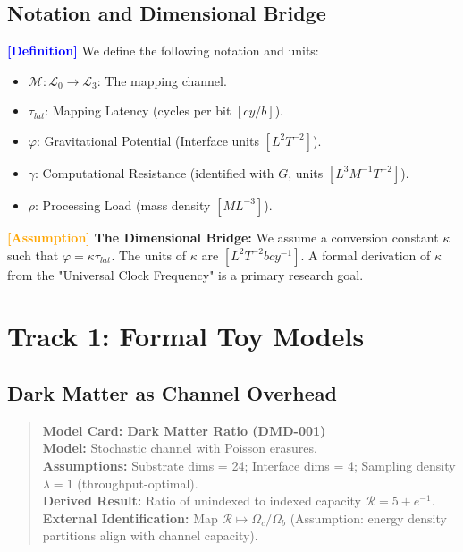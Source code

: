 \documentclass[11pt,titlepage]{article}
\newcommand{\substrate}{\mathcal{L}_0}
\newcommand{\interface}{\mathcal{L}_3}
\newcommand{\tagdef}{\textcolor{blue}{\textbf{[Definition]}} }
\newcommand{\tagass}{\textcolor{orange}{\textbf{[Assumption]}} }
\begin{document}
\subsection{Notation and Dimensional Bridge}
\tagdef We define the following notation and units:
\begin{itemize}
    
\item $\mathcal{M}: \substrate \to \interface$: The mapping channel.
    
\item $\tau_{lat}$: Mapping Latency (cycles per bit $[cy/b]$).
    
\item $\varphi$: Gravitational Potential (Interface units $[L^2 T^{-2}]$).
    
\item $\gamma$: Computational Resistance (identified with $G$, units $[L^3 M^{-1} T^{-2}]$).
    
\item $\rho$: Processing Load (mass density $[M L^{-3}]$).
\end{itemize}

\tagass \textbf{The Dimensional Bridge:} We assume a conversion constant $\kappa$ such that $\varphi = \kappa \tau_{lat}$. The units of $\kappa$ are $[L^2 T^{-2} b cy^{-1}]$. A formal derivation of $\kappa$ from the "Universal Clock Frequency" is a primary research goal.

\section{Track 1: Formal Toy Models}

\subsection{Dark Matter as Channel Overhead}
\begin{quote}
\textbf{Model Card: Dark Matter Ratio (DMD-001)} \\
\textbf{Model:} Stochastic channel with Poisson erasures. \\
\textbf{Assumptions:} Substrate dims = 24; Interface dims = 4; Sampling density $\lambda=1$ (throughput-optimal). \\
\textbf{Derived Result:} Ratio of unindexed to indexed capacity $\mathcal{R} = 5 + e^{-1}$. \\
\textbf{External Identification:} Map $\mathcal{R} \mapsto \Omega_c/\Omega_b$ (Assumption: energy density partitions align with channel capacity).
\end{quote}
\end{document}
